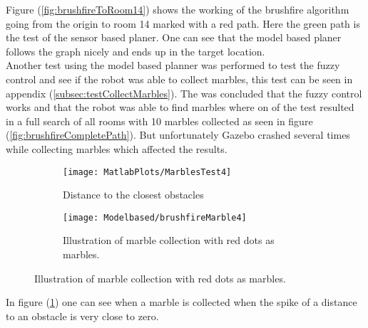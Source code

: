 \documentclass[../Head/Main.tex]{subfiles}
\begin{document}
Figure (\ref{fig:brushfireToRoom14}) shows the working of the brushfire algorithm going from the origin to room 14 marked with a red path. Here the green path is the test of the sensor based planer. One can see that the model based planer follows the graph nicely and ends up in the target location.\\ 
Another test using the model based planner was performed to test the fuzzy control and see if the robot was able to collect marbles, this test can be seen in appendix (\ref{subsec:testCollectMarbles}). The was concluded that the fuzzy control works and that the robot was able to find marbles where on of the test resulted in a full search of all rooms with 10 marbles collected as seen in figure (\ref{fig:brushfireCompletePath}). But unfortunately Gazebo crashed several times while collecting marbles which affected the results.
  \begin{figure}[H]
   \begin{subfigure}[b]{0.49\textwidth}
    \centering
    \texttt{[image: MatlabPlots/MarblesTest4]}
    \caption{Distance to the closest obstacles}
    \label{fig:matlabPlotMarbletest14}
  \end{subfigure}
  \hfill
   \begin{subfigure}[b]{0.49\textwidth}
    \centering
    \texttt{[image: Modelbased/brushfireMarble4]}
    \caption{Illustration of marble collection with red dots as marbles.}
    \label{fig:brushfireMarbleFindingTest}
  \end{subfigure}
  \end{figure}  

In figure (\ref{fig:matlabPlotMarbletest14}) one can see when a marble is collected when the spike of a distance to an obstacle is very close to zero.
\end{document}
